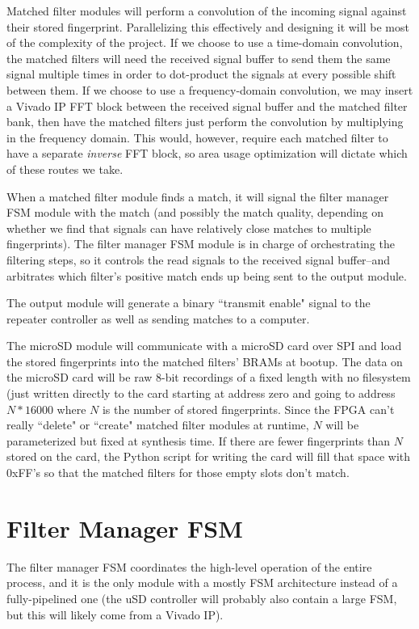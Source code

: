 \documentclass{article}
\begin{document}
Matched filter modules will perform a convolution of the incoming signal against their stored fingerprint. Parallelizing this effectively and designing it will be most of the complexity of the project. If we choose to use a time-domain convolution, the matched filters will need the received signal buffer to send them the same signal multiple times in order to dot-product the signals at every possible shift between them. If we choose to use a frequency-domain convolution, we may insert a Vivado IP FFT block between the received signal buffer and the matched filter bank, then have the matched filters just perform the convolution by multiplying in the frequency domain. This would, however, require each matched filter to have a separate \emph{inverse} FFT block, so area usage optimization will dictate which of these routes we take.

When a matched filter module finds a match, it will signal the filter manager FSM module with the match (and possibly the match quality, depending on whether we find that signals can have relatively close matches to multiple fingerprints). The filter manager FSM module is in charge of orchestrating the filtering steps, so it controls the read signals to the received signal buffer--and arbitrates which filter's positive match ends up being sent to the output module.

The output module will generate a binary ``transmit enable" signal to the repeater controller as well as sending matches to a computer.

The microSD module will communicate with a microSD card over SPI and load the stored fingerprints into the matched filters' BRAMs at bootup. The data on the microSD card will be raw 8-bit recordings of a fixed length with no filesystem (just written directly to the card starting at address zero and going to address $ N * 16000 $ where $ N $ is the number of stored fingerprints. Since the FPGA can't really ``delete" or ``create" matched filter modules at runtime, $ N $ will be parameterized but fixed at synthesis time. If there are fewer fingerprints than $ N $ stored on the card, the Python script for writing the card will fill that space with 0xFF's so that the matched filters for those empty slots don't match.

\section{Filter Manager FSM}

The filter manager FSM coordinates the high-level operation of the entire process, and it is the only module with a mostly FSM architecture instead of a fully-pipelined one (the uSD controller will probably also contain a large FSM, but this will likely come from a Vivado IP).
\end{document}
